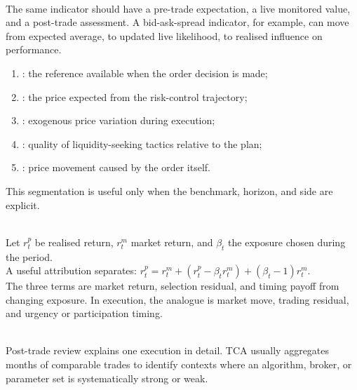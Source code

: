 \documentclass[a4paper,oneside,openany]{book}
\begin{document}
\begin{principle} \\
The same indicator should have a pre-trade expectation, a live monitored value, and a post-trade assessment. A bid-ask-spread indicator, for example, can move from expected average, to updated live likelihood, to realised influence on performance.
\end{principle}

\begin{taxonomy} 
\begin{enumerate}[label=\roman*.]
\setlength{\itemsep}{0pt}
\item {}: the reference available when the order decision is made;
\item {}: the price expected from the risk-control trajectory;
\item {}: exogenous price variation during execution;
\item {}: quality of liquidity-seeking tactics relative to the plan;
\item {}: price movement caused by the order itself.
\end{enumerate}
This segmentation is useful only when the benchmark, horizon, and side are explicit.
\end{taxonomy}

\begin{model} \\
Let $r^p_t$ be realised return, $r^m_t$ market return, and $\beta_t$ the exposure chosen during the period.\\
A useful attribution separates: $r^p_t = r^m_t + (r^p_t-\beta_t r^m_t)+(\beta_t-1)r^m_t$.\\
The three terms are market return, selection residual, and timing payoff from changing exposure. In execution, the analogue is market move, trading residual, and urgency or participation timing.
\end{model}

\begin{caveat} \\
Post-trade review explains one execution in detail. TCA usually aggregates months of comparable trades to identify contexts where an algorithm, broker, or parameter set is systematically strong or weak.
\end{caveat}
\end{document}
